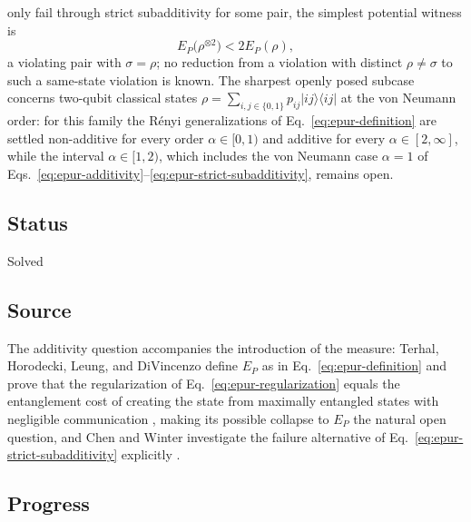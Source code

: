 only fail through strict subadditivity for some pair, the simplest
potential witness is
\begin{equation}
  E_P\bigl(\rho^{\otimes2}\bigr)<2E_P(\rho),
  \label{eq:epur-strict-subadditivity}
\end{equation}
a violating pair with $\sigma=\rho$; no reduction from a violation with
distinct $\rho\neq\sigma$ to such a same-state violation is known.
The sharpest openly posed subcase concerns two-qubit classical states
$\rho=\sum_{i,j\in\{0,1\}}p_{ij}|ij\rangle\langle ij|$ at the von Neumann
order: for this family the R\'enyi generalizations of
Eq.~\eqref{eq:epur-definition} are settled non-additive for every order
$\alpha\in[0,1)$ and additive for every $\alpha\in[2,\infty]$, while the
interval $\alpha\in[1,2)$, which includes the von Neumann case $\alpha=1$
of Eqs.~\eqref{eq:epur-additivity}--\eqref{eq:epur-strict-subadditivity},
remains open.

\subsection*{Status}

Solved

\subsection*{Source}

The additivity question accompanies the introduction of the measure: Terhal,
Horodecki, Leung, and DiVincenzo define $E_P$ as in
Eq.~\eqref{eq:epur-definition} and prove that the regularization of
Eq.~\eqref{eq:epur-regularization} equals the entanglement cost of creating
the state from maximally entangled states with negligible communication
, making its possible collapse to $E_P$
the natural open question, and Chen and Winter investigate the failure
alternative of Eq.~\eqref{eq:epur-strict-subadditivity} explicitly
.

\subsection*{Progress}

